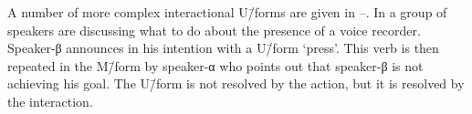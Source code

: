 \begin{exe}
	\label{ex2:19/09/14 p.97}
	\begin{xlist}
		\label{ex2:19/09/14 p.97-1}
		\label{ex2:19/09/14 p.97-2}
	\end{xlist}
\end{exe}

A number of more complex interactional U\=/forms are given
in --.
In  a group of speakers are discussing what
to do about the presence of a voice recorder.
Speaker-β announces in  his intention
with a U\=/form  `press'.
This verb is then repeated in the M\=/form by speaker-α who
points out that speaker-β is not achieving his goal.
The U\=/form is not resolved by the action,
but it is resolved by the interaction.

